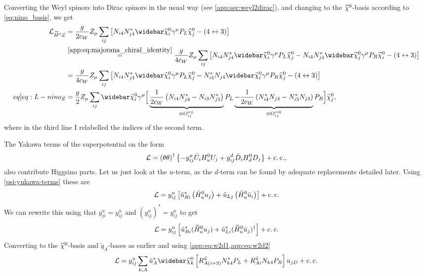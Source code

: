 \documentclass[english, notitlepage]{article}
\begin{document}
Converting the Weyl spinors into Dirac spinors in the usual way (see \cref{app:sec:weyl2dirac}), and changing to the \(\nino\)-basis according to \cref{eq:nino_basis}, we get
\begin{align}
    \nonumber
    \L_{\wtilde{H}^0Z} & = \frac{g}{2c_W} Z_\mu \sum_{ij} \bclosed{N_{i4}N_{j4}^\ast \barnino[i]\gamma^\mu P_L \nino[j] - (4 \leftrightarrow 3)}                                                                                                                                                                                     \\
    \nonumber
                       & \stackrel{\mathrm{\cref{app:eq:majorana_chiral_identity}}}{=} \frac{g}{4c_W} Z_\mu \sum_{ij} \bclosed{N_{i4}N_{j4}^\ast \barnino[i]\gamma^\mu P_L \nino[j] - N_{i4}N_{j4}^\ast \barnino[j]\gamma^\mu P_R \nino[i] - (4 \leftrightarrow 3)}                                                                  \\
    \nonumber
                       & = \frac{g}{4c_W} Z_\mu \sum_{ij} \bclosed{N_{i4}N_{j4}^\ast \barnino[i]\gamma^\mu P_L \nino[j] - N_{i4}^\ast N_{j4} \barnino[i]\gamma^\mu P_R \nino[j] - (4 \leftrightarrow 3)}                                                                                                                             \\
    \label[eq]{eq:L-nino_Z}
                       & = \frac{g}{2} Z_\mu \sum_{ij} \barnino[i] \gamma^\mu \Big[ \underbrace{\frac{1}{2c_W}\pclosed{N_{i4}N_{j4}^\ast - N_{i3}N_{j3}^\ast}}_{\equiv O^{\prime\prime L}_{ij}}P_L \underbrace{-\frac{1}{2c_W}\pclosed{N_{i4}^\ast N_{j4} - N_{i3}^\ast N_{j3}}}_{\equiv O^{\prime\prime R}_{ij}}P_R \Big] \nino[j],
\end{align}
where in the third line I relabelled the indices of the second term.
\medskip

The Yakawa terms of the superpotential on the form
\begin{equation}
    \L = \pclosed{\theta\theta}^\dagger \cclosed{-y^u_{ij} \bar{U}_i H_u^0 U_j + y^d_{ij} \bar{D}_i H_d^0 D_j} + \cc,
\end{equation}
also contribute Higgsino parts.
Let us just look at the \(u\)-term, as the \(d\)-term can be found by adequate replacements detailed later.
Using \cref{psi-yukawa-terms} these are
\begin{align}
    \L = y^u_{ij} \bclosed{\tilde{u}_{Ri}^\ast \pclosed{\tilde{H}_u^0 u_j} + \tilde{u}_{Lj} \pclosed{\tilde{H}_u^0 \bar{u}_i}} + \cc
\end{align}
We can rewrite this using that \(y^u_{ji} = y^u_{ij}\) and \((y^u_{ij})^\ast = y^u_{ij}\) to get
\begin{equation}
    \L = y^u_{ij} \bclosed{\tilde{u}_{Ri}^\ast (\hinou u_j) + \tilde{u}_{Li}^\ast (\hinou \bar{u}_j)^\dagger} + \cc
\end{equation}
Converting to the \(\nino[]\)-basis and \(\tilde{q}_A\)-bases as earlier and using \cref{app:eq:w2d1,app:eq:w2d2}
\begin{align}
    \L = y^u_{ij} \sum_{k, A} \tilde{u}_A^\ast \barnino[k] \bclosed{R^{\tilde{u}}_{A(i+3)} N_{k4}^\ast P_L + R^{\tilde{u}}_{Ai} N_{k4} P_R} u_{j D} + \cc
\end{align}
\end{document}
